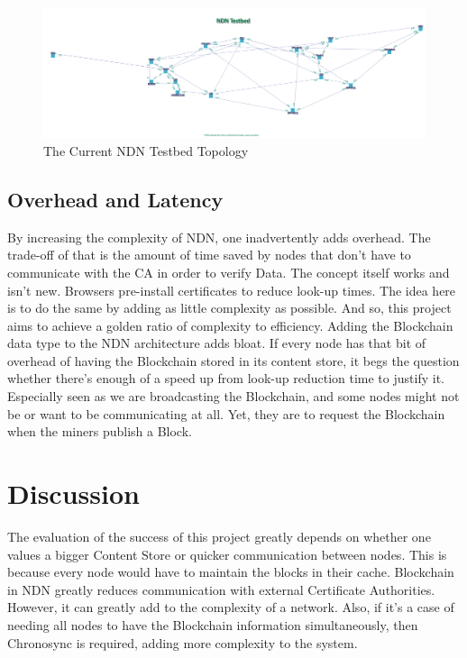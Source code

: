 \begin{figure}
\includegraphics[width=6in]{topology.png}
\caption{The Current NDN Testbed Topology \cite{055}}
\end{figure}
\subsection{Overhead and Latency}
By increasing the complexity of NDN, one inadvertently adds overhead. The trade-off of that is the amount of time saved by nodes that don't have to communicate with the CA in order to verify Data. The concept itself works and isn't new. Browsers pre-install certificates to reduce look-up times. The idea here is to do the same by adding as little complexity as possible. And so, this project aims to achieve a golden ratio of complexity to efficiency. Adding the Blockchain data type to the NDN architecture adds bloat. If every node has that bit of overhead of having the Blockchain stored in its content store, it begs the question whether there's enough of a speed up from look-up reduction time to justify it. Especially seen as we are broadcasting the Blockchain, and some nodes might not be or want to be communicating at all. Yet, they are to request the Blockchain when the miners publish a Block.
\section{Discussion}
The evaluation of the success of this project greatly depends on whether one values a bigger Content Store or quicker communication between nodes. This is because every node would have to maintain the blocks in their cache. Blockchain in NDN greatly reduces communication with external Certificate Authorities. However, it can greatly add to the complexity of a network. Also, if it's a case of needing all nodes to have the Blockchain information simultaneously, then Chronosync is required, adding more complexity to the system. 
